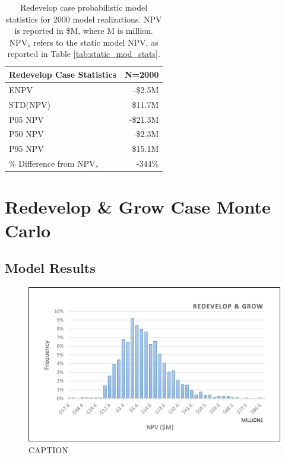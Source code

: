 \begin{table}[!htp]
\centering
\begin{tabular}{|l|r|}
\hline
\textbf{Redevelop Case Statistics} & N=2000 \\ \hline
ENPV & -\$2.5M \\ \hline
STD(NPV) & \$11.7M \\ \hline
P05 NPV & -\$21.3M \\ \hline
P50 NPV & -\$2.3M \\ \hline
P95 NPV & \$15.1M \\ \hline
\% Difference from NPV$_{s}$ & -344\% \\ \hline
\end{tabular}
\caption[Probabilistic Redevelop Case statistics]{Redevelop case probabilistic model statistics for 2000 model realizations. NPV is reported in \$M, where M is million. NPV$_s$ refers to the static model NPV, as reported in Table \ref{tab:static_mod_stats}.}
\label{tab:redevelop_stats}
\end{table}


\section{Redevelop \& Grow Case Monte Carlo}

\subsection{Model Results}
\label{ch6:grow_results}

\begin{figure}[!htp]
\centering
\includegraphics[width=.98\textwidth]{templates/images/Figure-Grow_Case_Histogram.png}
\caption[Redevelop \& Grow Case histogram]{CAPTION}
\label{fig:grow_case_hist}
\end{figure}

